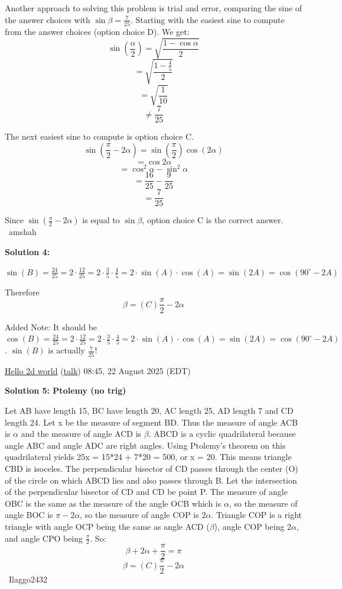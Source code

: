 \begin{enumerate}
Another approach to solving this problem is trial and error, comparing the sine of the answer choices with $\sin\beta = \frac{7}{25}$. Starting with the easiest sine to compute from the answer choices (option choice D). We get:
 \[\sin{\left(\frac{\alpha}{2}\right)} = \sqrt{\frac{1 - \cos{\alpha}}{2}}\]
 \[= \sqrt{\frac{1 - \frac{4}{5}}{2}}\]
 \[= \sqrt{\frac{1}{10}}\]
 \[\neq \frac{7}{25}\]

 The next easiest sine to compute is option choice C.
 \[\sin{\left(\frac{\pi}{2} - 2\alpha\right)} = \sin{\left(\frac{\pi}{2}\right)}\cos{\left(2\alpha\right)}\]
 \[=\cos{2\alpha}\]
 \[=\cos^2{\alpha} - \sin^2{\alpha}\]
 \[=\frac{16}{25} - \frac{9}{25}\]
 \[=\frac{7}{25}\]

 Since $\sin\left(\frac{\pi}{2} - 2\alpha\right)$ is equal to $\sin\beta$, option choice C is the correct answer. ~amshah

 



\textbf{Solution 4:}

$\sin(B) = \frac{24}{25} = 2 \cdot \frac{12}{25} = 2 \cdot \frac{3}{5} \cdot \frac{4}{5}  = 2 \cdot \sin(A) \cdot \cos(A) = \sin(2A)  = \cos(90^{\circ} - 2A)$ 

 Therefore 
 \[\beta=\boxed{(C) \frac{\pi}{2} -2\alpha}\]

 Added Note: It should be $\cos(B) = \frac{24}{25} = 2 \cdot \frac{12}{25} = 2 \cdot \frac{3}{5} \cdot \frac{4}{5}  = 2 \cdot \sin(A) \cdot \cos(A) = \sin(2A)  = \cos(90^{\circ} - 2A)$. $\sin(B)$ is actually $\frac{7}{25}$!

 \href{https://artofproblemsolving.com/wiki/index.php?title=User:Hello\_2d\_world&action=edit&redlink=1}{Hello 2d world} (\href{https://artofproblemsolving.com/wiki/index.php?title=User\_talk:Hello\_2d\_world&action=edit&redlink=1}{talk}) 08:45, 22 August 2025 (EDT)

 



\textbf{Solution 5: Ptolemy (no trig)}

Let AB have length 15, BC have length 20, AC length 25, AD length 7 and CD length 24. Let x be the measure of segment BD. Thus the measure of angle ACB is $\alpha$ and the measure of angle ACD is $\beta$. ABCD is a cyclic quadrilateral because angle ABC and angle ADC are right angles. Using Ptolemy's theorem on this quadrilateral yields 25x = 15*24 + 7*20 = 500, or x = 20. This means triangle CBD is isoceles. The perpendicular bisector of CD passes through the center (O) of the circle on which ABCD lies and also passes through B. Let the intersection of the perpendicular bisector of CD and CD be point P. The measure of angle OBC is the same as the measure of the angle OCB which is $\alpha$, so the measure of angle BOC is ${\pi} - {2}{\alpha}$, so the measure of angle COP is ${2}{\alpha}$. Triangle COP is a right triangle with angle OCP being the same as angle ACD ($\beta$), angle COP being ${2}{\alpha}$, and angle CPO being $\frac{\pi}{2}$. So: 
 \[\beta + {2}\alpha + \frac{\pi}{2} = \pi\] 
 \[\beta=\boxed{(C) \frac{\pi}{2} -2\alpha}\]~Ilaggo2432


\end{enumerate}
